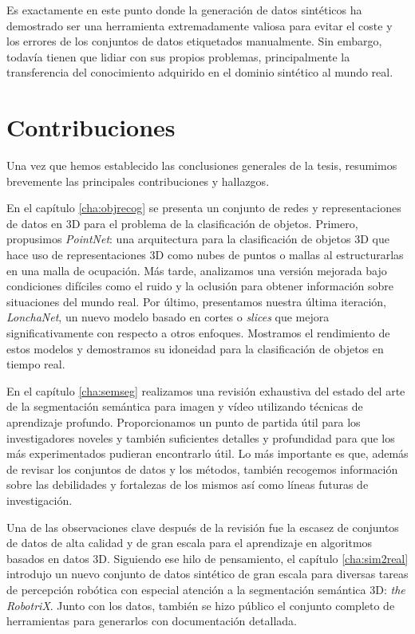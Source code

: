 Es exactamente en este punto donde la generación de datos sintéticos ha demostrado ser una herramienta extremadamente valiosa para evitar el coste y los errores de los conjuntos de datos etiquetados manualmente. Sin embargo, todavía tienen que lidiar con sus propios problemas, principalmente la transferencia del conocimiento adquirido en el dominio sintético al mundo real.

\section{Contribuciones}
\label{cha:conclusion_sp:sec:contributions}

Una vez que hemos establecido las conclusiones generales de la tesis, resumimos brevemente las principales contribuciones y hallazgos.

En el capítulo \ref{cha:objrecog} se presenta un conjunto de redes y representaciones de datos en 3D para el problema de la clasificación de objetos. Primero, propusimos \emph{PointNet}: una arquitectura para la clasificación de objetos \acs{3D} que hace uso de representaciones \acs{3D} como nubes de puntos o mallas al estructurarlas en una malla de ocupación. Más tarde, analizamos una versión mejorada bajo condiciones difíciles como el ruido y la oclusión para obtener información sobre situaciones del mundo real. Por último, presentamos nuestra última iteración, \emph{LonchaNet}, un nuevo modelo basado en cortes o \emph{slices} que mejora significativamente con respecto a otros enfoques. Mostramos el rendimiento de estos modelos y demostramos su idoneidad para la clasificación de objetos en tiempo real.

En el capítulo \ref{cha:semseg} realizamos una revisión exhaustiva del estado del arte de la segmentación semántica para imagen y vídeo utilizando técnicas de aprendizaje profundo. Proporcionamos un punto de partida útil para los investigadores noveles y también suficientes detalles y profundidad para que los más experimentados pudieran encontrarlo útil. Lo más importante es que, además de revisar los conjuntos de datos y los métodos, también recogemos información sobre las debilidades y fortalezas de los mismos así como líneas futuras de investigación.

Una de las observaciones clave después de la revisión fue la escasez de conjuntos de datos de alta calidad y de gran escala para el aprendizaje en algoritmos basados en datos \ac{3D}. Siguiendo ese hilo de pensamiento, el capítulo \ref{cha:sim2real} introdujo un nuevo conjunto de datos sintético de gran escala para diversas tareas de percepción robótica con especial atención a la segmentación semántica 3D: \emph{the RobotriX}. Junto con los datos, también se hizo público el conjunto completo de herramientas para generarlos con documentación detallada.

